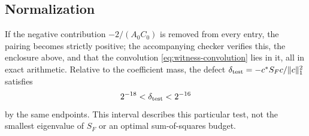 \subsection{Normalization}
If the negative contribution $-2/(A_0C_0)$ is removed from every entry,
the pairing becomes strictly positive; the accompanying checker verifies
this, the enclosure above, and that the convolution
\eqref{eq:witness-convolution} lies in it, all in exact arithmetic. Relative to the coefficient mass, the
defect $\delta_{\rm test}=-c^*S_Fc/\|c\|_1^2$ satisfies
\[
                            2^{-18}<\delta_{\rm test}<2^{-16}
\]
by the same endpoints. This interval describes this particular test,
not the smallest eigenvalue of $S_F$ or an optimal sum-of-squares
budget.
